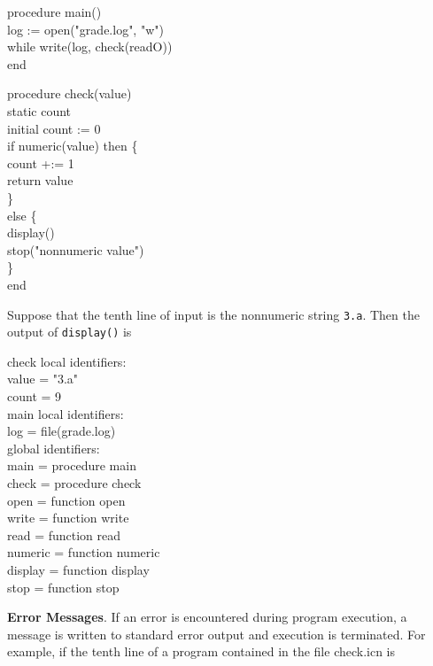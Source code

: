 \begin{iconcode}
\>procedure main()\\
\>\>log := open("grade.log", "w")\\
\>\>while write(log, check(readO))\\
\>end
\end{iconcode}

\bigskip

\begin{iconcode}
\>procedure check(value)\\
\>\>static count\\
\>\>initial count := 0\\
\>\>if numeric(value) then \{\\
\>\>\>count +:= 1\\
\>\>\>return value\\
\>\>\>\}\\
\>\>else \{\\
\>\>\>display()\\
\>\>\>stop("nonnumeric value")\\
\>\>\>\}\\
\>end
\end{iconcode}

Suppose that the tenth line of input is the nonnumeric string
\texttt{{\textquotedbl}3.a{\textquotedbl}}. Then the output of
\texttt{display()} is

\begin{iconcode}
\>check local identifiers:\\
\>\>value = "3.a"\\
\>\>count = 9\\
\>main local identifiers:\\
\>\>log = file(grade.log)\\
\>global identifiers:\\
\>\>main = procedure main\\
\>\>check = procedure check\\
\>\>open = function open\\
\>\>write = function write\\
\>\>read = function read\\
\>\>numeric = function numeric\\
\>\>display = function display\\
\>\>stop = function stop
\end{iconcode}

\textbf{Error Messages}. If an error is encountered during program
execution, a message is written to standard error output and execution
is terminated. For example, if the tenth line of a program contained
in the file check.icn is

